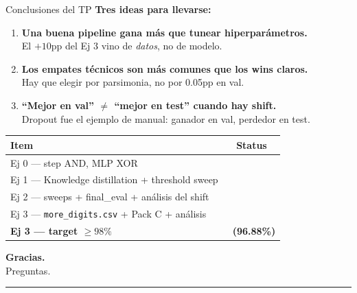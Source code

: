 \documentclass[11pt,aspectratio=169]{beamer}
\newcommand{\code}[1]{\texttt{\textcolor{accent}{#1}}}
\newcommand{\ok}{\textcolor{good}{\ding{52}}}
\newcommand{\nok}{\textcolor{warn}{\ding{56}}}
\begin{document}
\begin{frame}{Conclusiones del TP}
\textbf{Tres ideas para llevarse:}\\[0.4em]

\begin{enumerate}
  \item \textbf{Una buena pipeline gana más que tunear hiperparámetros.}\\
        El \(+10\)pp del Ej 3 vino de \emph{datos}, no de modelo.
  \item \textbf{Los empates técnicos son más comunes que los wins claros.}\\
        Hay que elegir por parsimonia, no por 0.05pp en val.
  \item \textbf{``Mejor en val'' \(\neq\) ``mejor en test'' cuando hay shift.}\\
        Dropout fue el ejemplo de manual: ganador en val, perdedor en test.
\end{enumerate}
\vspace{0.6em}

\centering\small
\begin{tabular}{@{}lc@{}}
\toprule
\textbf{Item} & \textbf{Status} \\
\midrule
Ej 0 — step AND, MLP XOR                                     & \ok \\
Ej 1 — Knowledge distillation + threshold sweep              & \ok \\
Ej 2 — sweeps + final\_eval + análisis del shift             & \ok \\
Ej 3 — \code{more\_digits.csv} + Pack C + análisis             & \ok \\
\textbf{Ej 3 — target \(\geq 98\%\)}                          & \nok\ \textbf{(96.88\%)} \\
\bottomrule
\end{tabular}
\end{frame}

{
\begin{frame}[plain]
\centering
\vspace*{2cm}
\color{white}
{\fontsize{36}{42}\selectfont\bfseries Gracias.}\\[1.5em]
{\Large Preguntas.}\\[2.5em]

\textcolor{white!75}{\rule{6cm}{0.4pt}}
\end{frame}
}
\end{document}
